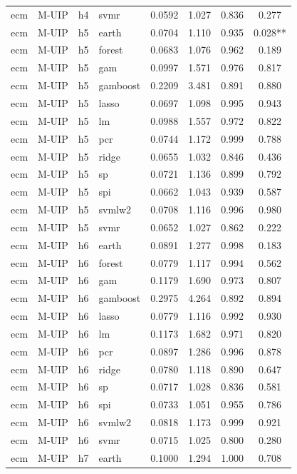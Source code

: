 \begin{ThreePartTable}
\begin{longtable}[t]{llclcccc}
ecm & M-UIP & h4 & svmr & 0.0592 & 1.027 & 0.836 & 0.277\\
\addlinespace
ecm & M-UIP & h5 & earth & 0.0704 & 1.110 & 0.935 & 0.028**\\
ecm & M-UIP & h5 & forest & 0.0683 & 1.076 & 0.962 & 0.189\\
ecm & M-UIP & h5 & gam & 0.0997 & 1.571 & 0.976 & 0.817\\
ecm & M-UIP & h5 & gamboost & 0.2209 & 3.481 & 0.891 & 0.880\\
ecm & M-UIP & h5 & lasso & 0.0697 & 1.098 & 0.995 & 0.943\\
ecm & M-UIP & h5 & lm & 0.0988 & 1.557 & 0.972 & 0.822\\
ecm & M-UIP & h5 & pcr & 0.0744 & 1.172 & 0.999 & 0.788\\
ecm & M-UIP & h5 & ridge & 0.0655 & 1.032 & 0.846 & 0.436\\
ecm & M-UIP & h5 & sp & 0.0721 & 1.136 & 0.899 & 0.792\\
ecm & M-UIP & h5 & spi & 0.0662 & 1.043 & 0.939 & 0.587\\
ecm & M-UIP & h5 & svmlw2 & 0.0708 & 1.116 & 0.996 & 0.980\\
ecm & M-UIP & h5 & svmr & 0.0652 & 1.027 & 0.862 & 0.222\\
\addlinespace
ecm & M-UIP & h6 & earth & 0.0891 & 1.277 & 0.998 & 0.183\\
ecm & M-UIP & h6 & forest & 0.0779 & 1.117 & 0.994 & 0.562\\
ecm & M-UIP & h6 & gam & 0.1179 & 1.690 & 0.973 & 0.807\\
ecm & M-UIP & h6 & gamboost & 0.2975 & 4.264 & 0.892 & 0.894\\
ecm & M-UIP & h6 & lasso & 0.0779 & 1.116 & 0.992 & 0.930\\
ecm & M-UIP & h6 & lm & 0.1173 & 1.682 & 0.971 & 0.820\\
ecm & M-UIP & h6 & pcr & 0.0897 & 1.286 & 0.996 & 0.878\\
ecm & M-UIP & h6 & ridge & 0.0780 & 1.118 & 0.890 & 0.647\\
ecm & M-UIP & h6 & sp & 0.0717 & 1.028 & 0.836 & 0.581\\
ecm & M-UIP & h6 & spi & 0.0733 & 1.051 & 0.955 & 0.786\\
ecm & M-UIP & h6 & svmlw2 & 0.0818 & 1.173 & 0.999 & 0.921\\
ecm & M-UIP & h6 & svmr & 0.0715 & 1.025 & 0.800 & 0.280\\
\addlinespace
ecm & M-UIP & h7 & earth & 0.1000 & 1.294 & 1.000 & 0.708\\

\end{longtable}
\end{ThreePartTable}
